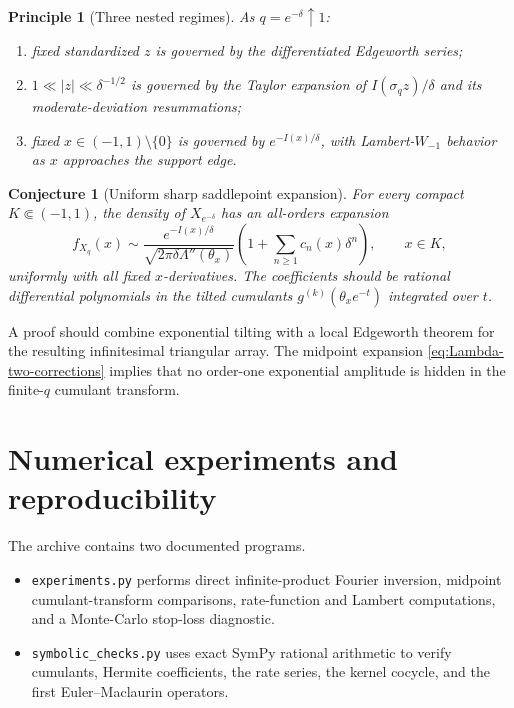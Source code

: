 \documentclass[11pt,a4paper]{article}
\newtheorem{conjecture}[theorem]{Conjecture}
\newtheorem{principle}[theorem]{Principle}
\theoremstyle{definition}
\newcommand{\1}{\mathbf{1}}
\begin{document}
\begin{principle}[Three nested regimes]
\label{prin:three-regimes}
As $q=e^{-\delta}\uparrow1$:
\begin{enumerate}[label=(\roman*)]
\item fixed standardized $z$ is governed by the differentiated Edgeworth
series;
\item $1\ll |z|\ll\delta^{-1/2}$ is governed by the Taylor expansion of
$I(\sigma_qz)/\delta$ and its moderate-deviation resummations;
\item fixed $x\in(-1,1)\setminus\{0\}$ is governed by
$e^{-I(x)/\delta}$, with Lambert-$W_{-1}$ behavior as $x$ approaches the
support edge.
\end{enumerate}
\end{principle}

\begin{conjecture}[Uniform sharp saddlepoint expansion]
\label{conj:saddlepoint}
For every compact $K\Subset(-1,1)$, the density of $X_{e^{-\delta}}$ has an
all-orders expansion
\begin{equation}
 f_{X_q}(x)\sim
 \frac{e^{-I(x)/\delta}}
      {\sqrt{2\pi\delta\Lambda''(\theta_x)}}
 \left(1+\sum_{n\ge1}c_n(x)\delta^n\right),
 \qquad x\in K,
 \label{eq:saddlepoint-conjecture}
\end{equation}
uniformly with all fixed $x$-derivatives.  The coefficients should be
rational differential polynomials in the tilted cumulants
$g^{(k)}(\theta_xe^{-t})$ integrated over $t$.
\end{conjecture}

A proof should combine exponential tilting with a local Edgeworth theorem for
the resulting infinitesimal triangular array.  The midpoint expansion
\eqref{eq:Lambda-two-corrections} implies that no order-one exponential
amplitude is hidden in the finite-$q$ cumulant transform.

\section{Numerical experiments and reproducibility}
\label{sec:numerics}

The archive contains two documented programs.

\begin{itemize}
\item \texttt{experiments.py} performs direct infinite-product Fourier
inversion, midpoint cumulant-transform comparisons, rate-function and
Lambert computations, and a Monte-Carlo stop-loss diagnostic.
\item \texttt{symbolic\_checks.py} uses exact SymPy rational arithmetic to
verify cumulants, Hermite coefficients, the rate series, the kernel cocycle,
and the first Euler--Maclaurin operators.
\end{itemize}
\end{document}
